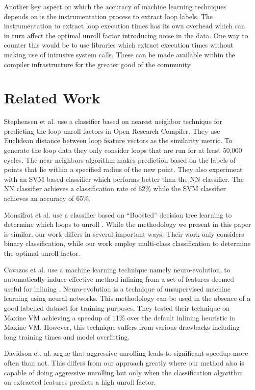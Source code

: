 \documentclass[]{sig-alternate}
\begin{document}
Another key aspect on which the accuracy of machine learning techniques depends on is the instrumentation process to extract loop labels. The instrumentation to extract loop execution times has its own overhead which can in turn affect the optimal unroll factor introducing noise in the data. One way to counter this would be to use libraries which extract execution times without making use of intrusive system calls. These can be made available within the compiler infrastructure for the greater good of the community.

\section{Related Work}
\label{sec:RelatedWork}
Stephensen et al. use a classifier based on nearest neighbor technique for predicting the loop unroll factors in Open Research Compiler. \cite{stephenson2005predicting} They use Euclidean distance between loop feature vectors as the similarity metric. To generate the loop data they only consider loops that are run for at least 50,000 cycles. The near neighbors algorithm makes prediction based on the labels of points that lie within a specified radius of the new point. They also experiment with an SVM based classifier which performs better than the NN classifier. The NN classifier achieves a classification rate of 62\% while the SVM classifier achieves an accuracy of 65\%.

Monsifrot et al. use a classifier based on ``Boosted'' decision tree
learning to determine which loops to unroll \cite{monsifrot2002machine}.  While the methodology we present in this paper is similar, our work differs in several important ways. Their work only considers binary classification, while our work employ multi-class classification to determine the optimal unroll factor. 

Cavazos et  al. use a machine learning technique namely neuro-evolution, to automatically induce effective method inlining from a set of features deemed useful for inlining \cite{kulkarni2013automatic}. Neuro-evolution is a technique of unsupervised machine learning using neural networks. This methodology can be used in the absence of a good labelled dataset for training purposes. They tested their technique on Maxine VM achieving a speedup of 11\% over the default inlining heuristic in Maxine VM. However, this technique suffers from various drawbacks including long training times and model overfitting.

Davidson et. al. argue that aggressive unrolling leads to significant speedup more often than not\cite{davidson1996aggressive}. This differs from our approach greatly where our method also is capable of doing aggressive unrolling but only when the classification algorithm on extracted features predicts a high unroll factor.
\end{document}
